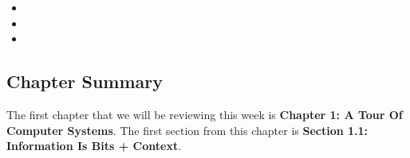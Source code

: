 \begin{itemize}
    \item {} 
    \item {} 
    \item {} 
\end{itemize}

\subsection{Chapter Summary}

The first chapter that we will be reviewing this week is \textbf{Chapter 1: A Tour Of Computer Systems}. The first section from this chapter is \textbf{Section 1.1: Information Is Bits + Context}.

